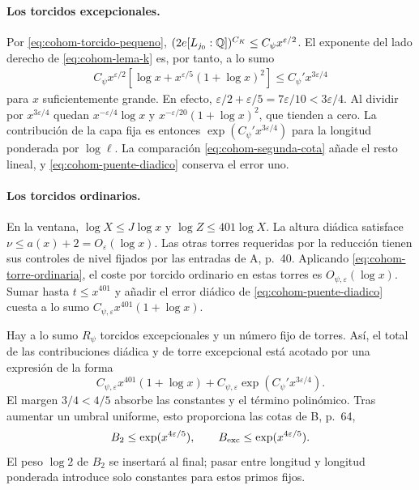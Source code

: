 \paragraph{Los torcidos excepcionales.}
Por \eqref{eq:cohom-torcido-pequeno},
$(2e[L_{j_0}:\mathbb{Q}])^{C_K}\le C_\psi x^{\varepsilon/2}$.
El exponente del lado derecho de
\eqref{eq:cohom-lema-k} es, por tanto, a lo sumo
\begin{equation}
 \begin{split}
 C_\psi x^{\varepsilon/2}
       [\log x+x^{\varepsilon/5}(1+\log x)^2]
 \le C_\psi' x^{3\varepsilon/4}
 \end{split}
 \label{eq:cohom-exponente-final}
\end{equation}
para $x$ suficientemente grande.
En efecto,
$\varepsilon/2+\varepsilon/5=7\varepsilon/10
 <3\varepsilon/4$.
Al dividir por $x^{3\varepsilon/4}$ quedan
$x^{-\varepsilon/4}\log x$ y
$x^{-\varepsilon/20}(1+\log x)^2$, que tienden a cero.
La contribución de la capa fija es entonces
$\exp(C_\psi'x^{3\varepsilon/4})$ para la longitud
ponderada por $\log\ell$.
La comparación \eqref{eq:cohom-segunda-cota} añade
el resto lineal, y \eqref{eq:cohom-puente-diadico}
conserva el error uno.

\paragraph{Los torcidos ordinarios.}
En la ventana,
$\log X\le J\log x$ y
$\log Z\le401\log X$.
La altura diádica satisface
$\nu\le a(x)+2=O_\varepsilon(\log x)$.
Las otras torres requeridas por la reducción tienen
sus controles de nivel fijados por las entradas de
A, p.~40. Aplicando \eqref{eq:cohom-torre-ordinaria},
el coste por torcido ordinario en estas torres es
$O_{\psi,\varepsilon}(\log x)$.
Sumar hasta $t\le x^{401}$ y añadir el error diádico
de \eqref{eq:cohom-puente-diadico} cuesta a lo sumo
$C_{\psi,\varepsilon}x^{401}(1+\log x)$.

Hay a lo sumo $R_\psi$ torcidos excepcionales y un
número fijo de torres. Así, el total de las contribuciones
diádica y de torre excepcional está acotado por una
expresión de la forma
\[
 C_{\psi,\varepsilon}x^{401}(1+\log x)
 +C_{\psi,\varepsilon}
        \exp(C_\psi'x^{3\varepsilon/4}).
\]
El margen $3/4<4/5$ absorbe las constantes y el término
polinómico. Tras aumentar un umbral uniforme, esto
proporciona las cotas de B, p.~64,
\begin{equation}
 B_2\le\exp(x^{4\varepsilon/5}),\qquad
 B_{\rm exc}\le\exp(x^{4\varepsilon/5}).
 \label{eq:cohom-cotas-torres}
\end{equation}
El peso $\log2$ de $B_2$ se insertará al final;
pasar entre longitud y longitud ponderada introduce
solo constantes para estos primos fijos.

